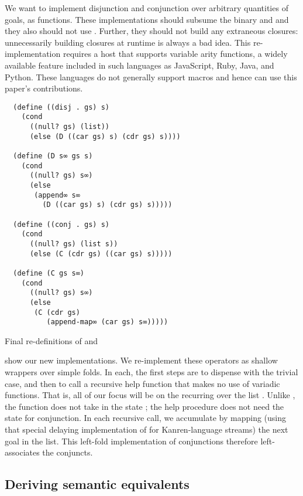 \documentclass[sigplan,balance,pbalance,natbib=false]{acmart}
\begin{document}
We want to implement disjunction and conjunction over arbitrary
quantities of goals, as functions. These implementations should
subsume the binary  and  and they
also should not use . Further, they should not build
any extraneous closures: unnecessarily building closures at runtime is
always a bad idea. This re-implementation requires a host that
supports variable arity functions, a widely available feature included
in such languages as JavaScript, Ruby, Java, and Python. These
languages do not generally support macros and hence can use this
paper's contributions.

\begin{listing}
\begin{verbatim}
  (define ((disj . gs) s)
    (cond
      ((null? gs) (list))
      (else (D ((car gs) s) (cdr gs) s))))

  (define (D s∞ gs s)
    (cond
      ((null? gs) s∞)
      (else
       (append∞ s∞
         (D ((car gs) s) (cdr gs) s)))))

  (define ((conj . gs) s)
    (cond
      ((null? gs) (list s))
      (else (C (cdr gs) ((car gs) s)))))

  (define (C gs s∞)
    (cond
      ((null? gs) s∞)
      (else
       (C (cdr gs)
          (append-map∞ (car gs) s∞)))))
\end{verbatim}
  \caption{Final re-definitions of  and }\label{mnt:disj-reimplementation}
\end{listing}

 show our
new implementations. We re-implement these operators as shallow
wrappers over simple folds. In each, the first steps are to dispense
with the trivial case, and then to call a recursive help function that
makes no use of variadic functions. That is, all of our focus will be
on the recurring over the list . Unlike ,
the function  does not take in the state ;
the help procedure does not need the state for conjunction. In each
recursive call, we accumulate by mapping (using that special delaying
implementation of  for Kanren-language
streams) the next goal in the list. This left-fold implementation of
conjunctions therefore left-associates the conjuncts.

\subsection{Deriving semantic equivalents}
\end{document}
